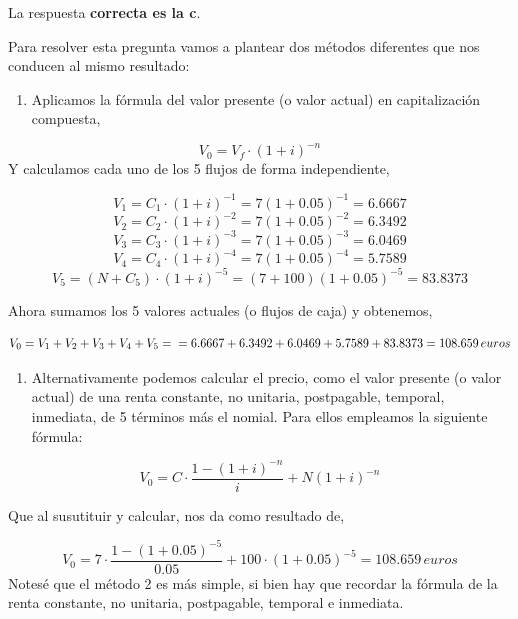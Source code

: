 \documentclass[
  letterpaper,
  DIV=11,
  numbers=noendperiod]{scrreprt}
\providecommand{\tightlist}{%
  \setlength{\itemsep}{0pt}\setlength{\parskip}{0pt}}\usepackage{longtable,booktabs,array}
\begin{document}
\begin{tcolorbox}[enhanced jigsaw, left=2mm, opacityback=0, colback=white, breakable, arc=.35mm, bottomrule=.15mm, rightrule=.15mm, toprule=.15mm, leftrule=.75mm, colframe=quarto-callout-tip-color-frame]
\begin{minipage}[t]{5.5mm}
\textcolor{quarto-callout-tip-color}{\faLightbulb}
\end{minipage}%
\begin{minipage}[t]{\textwidth - 5.5mm}

La respuesta \textbf{correcta es la c}.

Para resolver esta pregunta vamos a plantear dos métodos diferentes que
nos conducen al mismo resultado:

\begin{enumerate}
\def\labelenumi{\arabic{enumi}.}
\tightlist
\item
  Aplicamos la fórmula del valor presente (o valor actual) en
  capitalización compuesta,
\end{enumerate}

\[V_{0}=V_{f}\cdot (1+i)^{-n}\] Y calculamos cada uno de los 5 flujos de
forma independiente,

\[V_{1}=C_{1}\cdot (1+i)^{-1}=7(1+0.05)^{-1}=6.6667\]
\[V_{2}=C_{2}\cdot (1+i)^{-2}=7(1+0.05)^{-2}=6.3492\]
\[V_{3}=C_{3}\cdot (1+i)^{-3}=7(1+0.05)^{-3}=6.0469\]
\[V_{4}=C_{4}\cdot (1+i)^{-4}=7(1+0.05)^{-4}=5.7589\]
\[V_{5}=(N+C_{5})\cdot (1+i)^{-5}=(7+100)(1+0.05)^{-5}=83.8373\]

Ahora sumamos los 5 valores actuales (o flujos de caja) y obtenemos,

\[V_0=V_1+V_2+V_3+V_4+V_5=\\
=6.6667+6.3492+6.0469+5.7589+83.8373= 108.659\,euros \]

\begin{enumerate}
\def\labelenumi{\arabic{enumi}.}
\setcounter{enumi}{1}
\tightlist
\item
  Alternativamente podemos calcular el precio, como el valor presente (o
  valor actual) de una renta constante, no unitaria, postpagable,
  temporal, inmediata, de 5 términos más el nomial. Para ellos empleamos
  la siguiente fórmula:
\end{enumerate}

\[ V_0=C\cdot\frac{1-\left(1+i\right)^{-n}}{i}+N\left(1+i\right)^{-n}\]

Que al susutituir y calcular, nos da como resultado de,

\[ V_0=7\cdot\frac{1-\left(1+0.05\right)^{-5}}{0.05}+100\cdot \left(1+0.05\right)^{-5}=108.659\,euros\]
Notesé que el método 2 es más simple, si bien hay que recordar la
fórmula de la renta constante, no unitaria, postpagable, temporal e
inmediata.

\end{minipage}%
\end{tcolorbox}
\end{document}
